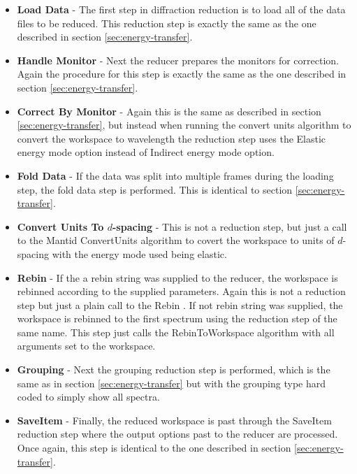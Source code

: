 \documentclass[paper=a4, fontsize=11pt]{scrartcl}	%
\numberwithin{equation}{section}															%
\numberwithin{figure}{section}																%
\numberwithin{table}{section}																%
\begin{document}
\begin{itemize}
\item \textbf{Load Data} - The first step in diffraction reduction is to load all of the data files to be reduced. This reduction step is exactly the same as the one described in section \ref{sec:energy-transfer}.

\item \textbf{Handle Monitor} - Next the reducer prepares the monitors for correction. Again the procedure for this step is exactly the same as the one described in section \ref{sec:energy-transfer}.

\item \textbf{Correct By Monitor} - Again this is the same as described in section \ref{sec:energy-transfer}, but instead when running the convert units algorithm to convert the workspace to wavelength the reduction step uses the Elastic energy mode option instead of Indirect energy mode option.

\item \textbf{Fold Data} - If the data was split into multiple frames during the loading step, the fold data step is performed. This is identical to section \ref{sec:energy-transfer}.

\item \textbf{Convert Units To $d$-spacing} - This is not a reduction step, but just a call to the Mantid ConvertUnits algorithm to covert the workspace to units of $d$-spacing with the energy mode used being elastic.

\item \textbf{Rebin} - If the a rebin string was supplied to the reducer, the workspace is rebinned according to the supplied parameters. Again this is not a reduction step but just a plain call to the Rebin . If not rebin string was supplied, the workspace is rebinned to the first spectrum using the reduction step of the same name. This step just calls the RebinToWorkspace algorithm with all arguments set to the workspace.

\item \textbf{Grouping} - Next the grouping reduction step is performed, which is the same as in section \ref{sec:energy-transfer} but with the grouping type hard coded to simply show all spectra.

\item \textbf{SaveItem} - Finally, the reduced workspace is past through the SaveItem reduction step where the output options past to the reducer are processed. Once again, this step is identical to the one described in section \ref{sec:energy-transfer}.

\end{itemize}
\end{document}

